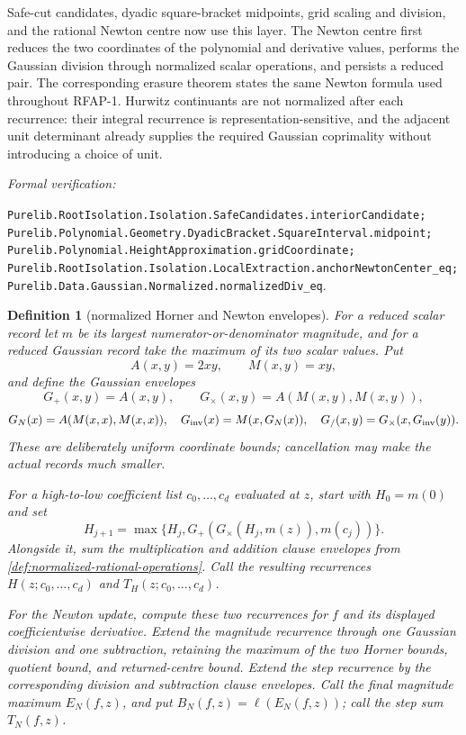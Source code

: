 \documentclass[11pt]{article}
\newtheorem{definition}[definition]{Definition}
\newcommand{\leanref}[1]{\par\smallskip\noindent
  \emph{Formal verification:}\par\nobreak
  {\raggedright\nolinkurl{#1}.\par}}
\begin{document}
Safe-cut candidates, dyadic square-bracket midpoints, grid scaling and
division, and the rational Newton centre now use this layer.  The Newton
centre first reduces the two coordinates of the polynomial and derivative
values, performs the Gaussian division through normalized scalar operations,
and persists a reduced pair.  The corresponding erasure theorem states the
same Newton formula used throughout RFAP-1.  Hurwitz continuants are not
normalized after each recurrence: their integral recurrence is
representation-sensitive, and the adjacent unit determinant already supplies
the required Gaussian coprimality without introducing a choice of unit.

\leanref{Purelib.RootIsolation.Isolation.SafeCandidates.interiorCandidate;
Purelib.Polynomial.Geometry.DyadicBracket.SquareInterval.midpoint;
Purelib.Polynomial.HeightApproximation.gridCoordinate;
Purelib.RootIsolation.Isolation.LocalExtraction.anchorNewtonCenter_eq;
Purelib.Data.Gaussian.Normalized.normalizedDiv_eq}

\begin{definition}[normalized Horner and Newton envelopes]
\label{def:normalized-horner-envelope}
For a reduced scalar record let $m$ be its largest numerator-or-denominator
magnitude, and for a reduced Gaussian record take the maximum of its two
scalar values.  Put
\[
 A(x,y)=2xy,\qquad M(x,y)=xy,
\]
and define the Gaussian envelopes
\[
 G_+(x,y)=A(x,y),\qquad
 G_\times(x,y)=A(M(x,y),M(x,y)),
\]
\[
 G_N(x)=A(M(x,x),M(x,x)),\quad
 G_{\rm inv}(x)=M(x,G_N(x)),\quad
 G_{/}(x,y)=G_\times(x,G_{\rm inv}(y)).
\]
These are deliberately uniform coordinate bounds; cancellation may make the
actual records much smaller.

For a high-to-low coefficient list $c_0,\ldots,c_d$ evaluated at $z$, start
with $H_0=m(0)$ and set
\[
 H_{j+1}=\max\{H_j,
   G_+(G_\times(H_j,m(z)),m(c_j))\}.
\]
Alongside it, sum the multiplication and addition clause envelopes from
\cref{def:normalized-rational-operations}.  Call the resulting recurrences
$H(z;c_0,\ldots,c_d)$ and $T_H(z;c_0,\ldots,c_d)$.

For the Newton update, compute these two recurrences for $f$ and its displayed
coefficientwise derivative.  Extend the magnitude recurrence through one
Gaussian division and one subtraction, retaining the maximum of the two
Horner bounds, quotient bound, and returned-centre bound.  Extend the step
recurrence by the corresponding division and subtraction clause envelopes.
Call the final magnitude maximum $E_N(f,z)$, and put
$B_N(f,z)=\ell(E_N(f,z))$; call the step sum $T_N(f,z)$.
\end{definition}
\end{document}
